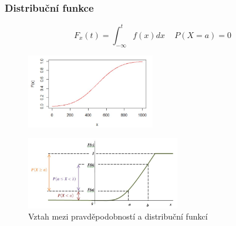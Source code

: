 \subsubsection{Distribuční funkce}
$$F_x(t) = \int_{-\infty}^{t} f(x) dx\, \quad P(X = a) = 0$$
\begin{figure}[H]
	\centering
	\includegraphics[width=0.5\textwidth]{assets/11_dist_fce_snv}
\end{figure}
\begin{figure}[H]
	\centering
	\includegraphics[width=0.6\textwidth]{assets/11_vztah_prav_dist_snv}
	\caption{Vztah mezi pravděpodobností a distribuční funkcí}
\end{figure}

